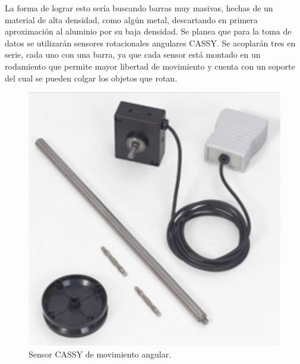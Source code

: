 La forma de lograr esto sería buscando barras muy masivas, hechas de un material de alta densidad, como algún metal, descartando en primera aproximación al aluminio por su baja densidad. Se planea que para la toma de datos se utilizarán sensores rotacionales angulares CASSY. Se acoplarán tres en serie, cada uno con una barra, ya que cada sensor está montado en un rodamiento que permite mayor libertad de movimiento y cuenta con un soporte del cual se pueden colgar los objetos que rotan.

\begin{figure}[htbp!]
  \centering
  \includegraphics[width=0.8\linewidth]{Figures/IM2.png}
  \caption{Sensor CASSY de movimiento angular.}
  \label{fig:sistema_pendulos}
\end{figure}

